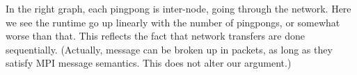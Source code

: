 In the right graph, each pingpong is inter-node, going through the network.
Here we see the runtime go up linearly with the number of pingpongs,
or somewhat worse than that.
This reflects the fact that network transfers are done sequentially.
(Actually, message can be broken up in packets, as long as they
satisfy MPI message semantics. This does not alter our argument.)

\begin{comment}
  \begin{figure}
    \tikzsetnextfilename{pingpong-msec}
    \begin{tikzpicture}  
      \begin{axis}
        [  
          xlabel={\#cores per node},
          ylabel={msec},
          symbolic x coords={14,20,28,56},
          xtick=data,  ytick={0,5,10,15,20,25},
        ]  
        \addplot coordinates {(14, 19.4) (20, 20.3) (28, 20.7) (56, 25.5) };
        \legend{milliseconds per pingpong}
      \end{axis}

      \begin{axis}
        [  
          ylabel={msec},
          scale only axis,
          symbolic x coords={14,20,28,56},
          xtick=data,  ytick={0,100,200,300,400},
          axis y line*=right,
          axis x line=none,
        ]  
        \addplot coordinates {(14, 99.4) (20, 132) (28, 189) (56, 379) };
      \end{axis}
    \end{tikzpicture}  
    \caption{Timing for pingpong between nodes}
  \end{figure}
\end{comment}

